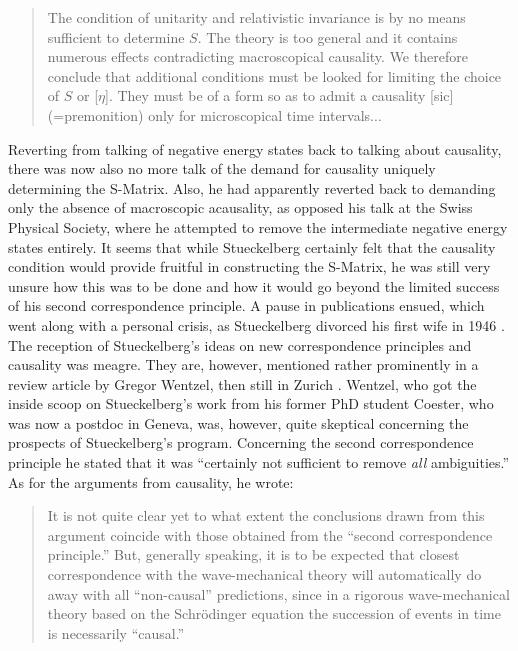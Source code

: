 \documentclass[12pt,a4paper]{article}
\begin{document}
\begin{quote}
The condition of unitarity and relativistic invariance is by no means sufficient to determine $S$. The theory is too general and it contains numerous effects contradicting macroscopical causality. We therefore conclude that additional conditions must be looked for limiting the choice of $S$ or [$\eta$]. They must be of a form so as to admit a causality [sic] (=premonition) only for microscopical time intervals...
\end{quote}

Reverting from talking of negative energy states back to talking about causality, there was now also no more talk of the demand for causality uniquely determining the S-Matrix. Also, he had apparently reverted back to demanding only the absence of macroscopic acausality, as opposed his talk at the Swiss Physical Society, where he attempted to remove the intermediate negative energy states entirely. It seems that while Stueckelberg certainly felt that the causality condition would provide fruitful in constructing the S-Matrix, he was still very unsure how this was to be done and how it would go beyond the limited success of his second correspondence principle. A pause in publications ensued, which went along with a personal crisis, as Stueckelberg divorced his first wife in 1946 \citep[p. 143]{crease_1986_the-second}. The reception of Stueckelberg's ideas on new correspondence principles and causality was meagre. They are, however, mentioned rather prominently in a review article by Gregor Wentzel, then still in Zurich \citep{wentzel_1947_recent}. Wentzel, who got the inside scoop on Stueckelberg's work from his former PhD student Coester, who was now a postdoc in Geneva, was, however, quite skeptical concerning the prospects of Stueckelberg's program. Concerning the second correspondence principle he stated that it was ``certainly not sufficient to remove \emph{all} ambiguities.'' As for the arguments from causality, he wrote:

\begin{quote}
It is not quite clear yet to what extent the conclusions drawn from this argument coincide with those obtained from the ``second correspondence principle.'' But, generally speaking, it is to be expected that closest correspondence with the wave-mechanical theory will automatically do away with all ``non-causal'' predictions, since in a rigorous wave-mechanical theory based on the Schr\"{o}dinger equation the succession of events in time is necessarily ``causal.''
\end{quote}
\end{document}
